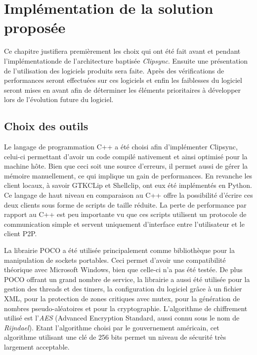 \chapter{Implémentation de la solution proposée}
\renewcommand{\leftmark}{\thechapter.~~Implémentation de la solution proposée}
\label{chap:implem}
Ce chapitre justifiera premièrement les choix qui ont été fait avant et
pendant l'implémentationde de l'architecture baptisée \emph{Clipsync}.
Ensuite une présentation de l'utilisation des
logiciels produits sera faite. Après des vérifications de performances seront
effectuées sur ces logiciels et enfin les faiblesses du logiciel seront mises
en avant afin de déterminer les éléments prioritaires à développer lors de
l'évolution future du logiciel.

\section{Choix des outils}
Le langage de programmation C++ a été choisi afin d'implémenter Clipsync,
celui-ci permettant d'avoir un code compilé nativement et ainsi optimisé
pour la machine hôte. Bien que ceci soit une source d'erreurs, il permet
aussi de gérer la mémoire manuellement, ce qui implique un gain de
performances. En revanche les client locaux, à savoir GTKCLip et Shellclip,
ont eux été implémentés en Python. Ce langage de haut niveau en comparaison
au C++ offre la possibilité d'écrire ces deux clients sous forme de scripts
de taille réduite. La perte de performance par rapport au C++ est peu
importante vu que ces scripts utilisent un protocole de communication simple
et servent uniquement d'interface entre l'utilisateur et le client P2P.

La librairie POCO\cite{poco} a été utilisée principalement comme bibliothèque
pour la manipulation de sockets portables. Ceci permet d'avoir une
compatibilité théorique avec Microsoft Windows, bien que celle-ci n'a pas
été testée. De plus POCO offrant un grand nombre de service, la librairie
a aussi été utilisée pour la gestion des threads et des timers, la
configuration du logiciel grâce à un fichier XML, pour la protection de
zones critiques avec mutex, pour la génération de
nombres pseudo-aléatoires et pour la cryptographie. L'algorithme de chiffrement
utilisé est l'\emph{AES}\cite{daemen2002the} (Advanced Encryption Standard,
aussi connu sous le nom de \emph{Rijndael}). Etant l'algorithme choisi par le
gouvernement américain, cet algorithme utilisant une clé de 256 bits permet un
niveau de sécurité très largement acceptable.

